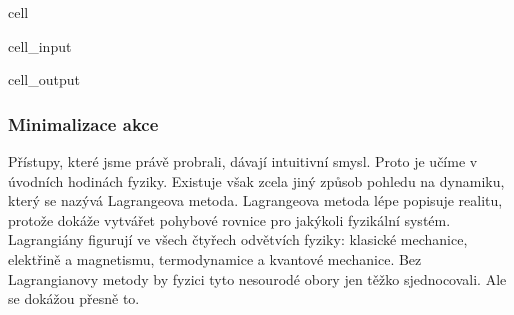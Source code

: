 \documentclass[letterpaper,10pt,english]{jupyterBook}
\begin{document}
\begin{sphinxuseclass}{cell}
\begin{sphinxVerbatimInput}
\begin{sphinxuseclass}{cell_input}
\end{sphinxuseclass}\end{sphinxVerbatimInput}
\begin{sphinxVerbatimOutput}

\begin{sphinxuseclass}{cell_output}
\noindent{}

\end{sphinxuseclass}\end{sphinxVerbatimOutput}

\end{sphinxuseclass}

\subsubsection{Minimalizace akce}
\label{\detokenize{Prednasky/1_5_Lagrange_Eulerovy_rovnice:minimalizace-akce}}
\sphinxAtStartPar
{} Přístupy, které jsme právě probrali, dávají intuitivní smysl. Proto je učíme v úvodních hodinách fyziky. Existuje však zcela jiný způsob pohledu na dynamiku, který se nazývá Lagrangeova metoda. Lagrangeova metoda lépe popisuje realitu, protože dokáže vytvářet pohybové rovnice pro jakýkoli fyzikální systém. Lagrangiány figurují ve všech čtyřech odvětvích fyziky: klasické mechanice, elektřině a magnetismu, termodynamice a kvantové mechanice. Bez Lagrangianovy metody by fyzici tyto nesourodé obory jen těžko sjednocovali. Ale se  dokážou přesně to.
\end{document}
